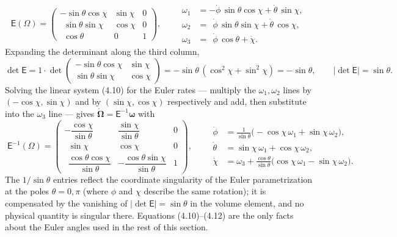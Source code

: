 \begin{equation}
\boxed{\;
\mathsf E(\Omega)=
\begin{pmatrix}
-\sin\theta\cos\chi & \sin\chi & 0\\[2pt]
\ \ \sin\theta\sin\chi & \cos\chi & 0\\[2pt]
\ \ \cos\theta & 0 & 1
\end{pmatrix},\qquad
\begin{aligned}
\omega_1&=-\dot\phi\,\sin\theta\cos\chi+\dot\theta\,\sin\chi,\\
\omega_2&=\ \ \dot\phi\,\sin\theta\sin\chi+\dot\theta\,\cos\chi,\\
\omega_3&=\ \ \dot\phi\,\cos\theta+\dot\chi .
\end{aligned}\;}\tag{4.10}
\end{equation}
Expanding the determinant along the third column,
\begin{equation}
\det\mathsf E
=1\cdot\det\!\begin{pmatrix}-\sin\theta\cos\chi&\sin\chi\\ \sin\theta\sin\chi&\cos\chi\end{pmatrix}
=-\sin\theta\,(\cos^2\chi+\sin^2\chi)=-\sin\theta,\qquad |\det\mathsf E|=\sin\theta . \tag{4.11}
\end{equation}
Solving the linear system (4.10) for the Euler rates --- multiply the $\omega_1,\omega_2$ lines by $(-\cos\chi,\sin\chi)$ and by $(\sin\chi,\cos\chi)$ respectively and add, then substitute into the $\omega_3$ line --- gives $\dot{\boldsymbol\Omega}=\mathsf E^{-1}\boldsymbol\omega$ with
\begin{equation}
\boxed{\;
\mathsf E^{-1}(\Omega)=
\begin{pmatrix}
-\dfrac{\cos\chi}{\sin\theta} & \dfrac{\sin\chi}{\sin\theta} & 0\\[10pt]
\ \ \sin\chi & \cos\chi & 0\\[6pt]
\ \ \dfrac{\cos\theta\cos\chi}{\sin\theta} & -\dfrac{\cos\theta\sin\chi}{\sin\theta} & 1
\end{pmatrix},
\qquad
\begin{aligned}
\dot\phi&=\tfrac{1}{\sin\theta}\bigl(-\cos\chi\,\omega_1+\sin\chi\,\omega_2\bigr),\\
\dot\theta&=\sin\chi\,\omega_1+\cos\chi\,\omega_2,\\
\dot\chi&=\omega_3+\tfrac{\cos\theta}{\sin\theta}\bigl(\cos\chi\,\omega_1-\sin\chi\,\omega_2\bigr).
\end{aligned}\;}\tag{4.12}
\end{equation}
The $1/\sin\theta$ entries reflect the coordinate singularity of the Euler parametrization at the poles $\theta=0,\pi$ (where $\phi$ and $\chi$ describe the same rotation); it is compensated by the vanishing of $|\det\mathsf E|=\sin\theta$ in the volume element, and no physical quantity is singular there. Equations (4.10)--(4.12) are the only facts about the Euler angles used in the rest of this section.

